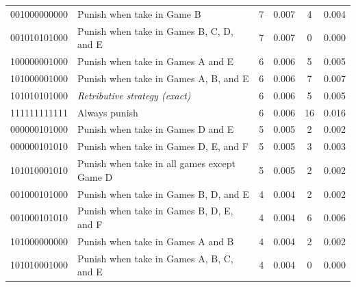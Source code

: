 \documentclass[
  man,floatsintext]{apa6}
\begin{document}
\begin{table}[H]
\begin{center}
\begin{threeparttable}
{\begin{tabular}{llcccc}
001000000000 & Punish when take in Game B & 7 & 0.007 & 4 & 0.004\\
001010101000 & Punish when take in Games B, C, D, and E & 7 & 0.007 & 0 & 0.000\\
100000001000 & Punish when take in Games A and E & 6 & 0.006 & 5 & 0.005\\
101000001000 & Punish when take in Games A, B, and E & 6 & 0.006 & 7 & 0.007\\
101010101000 & \textit{Retributive strategy (exact)} & 6 & 0.006 & 5 & 0.005\\
111111111111 & Always punish & 6 & 0.006 & 16 & 0.016\\
000000101000 & Punish when take in Games D and E & 5 & 0.005 & 2 & 0.002\\
000000101010 & Punish when take in Games D, E, and F & 5 & 0.005 & 3 & 0.003\\
101010001010 & Punish when take in all games except Game D & 5 & 0.005 & 2 & 0.002\\
001000101000 & Punish when take in Games B, D, and E & 4 & 0.004 & 2 & 0.002\\
001000101010 & Punish when take in Games B, D, E, and F & 4 & 0.004 & 6 & 0.006\\
101000000000 & Punish when take in Games A and B & 4 & 0.004 & 2 & 0.002\\
101010001000 & Punish when take in Games A, B, C, and E & 4 & 0.004 & 0 & 0.000\\
\bottomrule
\end{tabular}

}

\end{threeparttable}
\end{center}

\end{table}

\newpage
\end{document}
